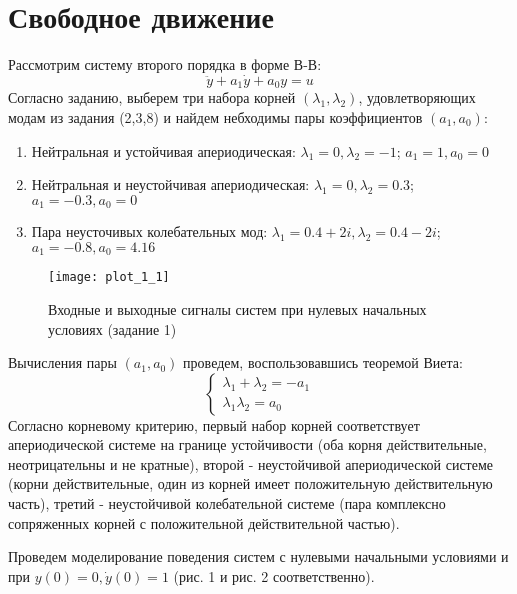 \tableofcontents
\pagebreak

\section{Свободное движение}
Рассмотрим систему второго порядка в форме В-В:
\begin{equation}
    \ddot{y} + a_1 \dot{y} + a_0 y  = u
\end{equation}
Согласно заданию, выберем три набора корней $(\lambda_1, \lambda_2)$, удовлетворяющих модам из задания (2,3,8)
и найдем небходимы пары коэффициентов $(a_1, a_0)$:
\begin{enumerate}
    \item Нейтральная и устойчивая апериодическая: $\lambda_1 = 0, \lambda_2 = -1$; $a_1 = 1, a_0 = 0$
    \item Нейтральная и неустойчивая апериодическая: $\lambda_1 = 0, \lambda_2 = 0.3$; $a_1 = -0.3, a_0 = 0$
    \item Пара неусточивых колебательных мод: $\lambda_1 = 0.4 + 2i, \lambda_2 = 0.4 - 2i$; $a_1 = -0.8, a_0 = 4.16$
\end{enumerate}


\begin{figure}[h]
    \centering
    \texttt{[image: plot\_1\_1]}
    \caption{\label{fig:The-caption-1}Входные и выходные сигналы систем при нулевых начальных условиях (задание 1)}
\end{figure}

Вычисления пары $(a_1, a_0)$ проведем, воспользовавшись теоремой Виета:
\begin{equation*}
    \begin{cases}
        \lambda_1 + \lambda_2 = - a_1 \\
        \lambda_1 \lambda_2 = a_0
    \end{cases}
\end{equation*}
Согласно корневому критерию, первый набор корней соответствует апериодической системе на границе 
 устойчивости (оба корня действительные, неотрицательны и не кратные), второй - неустойчивой 
 апериодической системе (корни действительные, один из корней имеет положительную действительную часть),
 третий - неустойчивой колебательной системе (пара комплексно сопряженных корней с положительной 
 действительной частью).

 Проведем моделирование поведения систем с нулевыми начальными условиями и при $y(0)=0, \dot y (0) = 1$ 
 (рис. 1 и рис. 2 соответственно).
 

